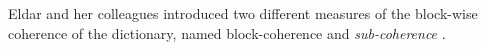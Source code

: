 Eldar and her colleagues introduced two different measures of the block-wise coherence of the dictionary, named block-coherence and \emph{sub-coherence} \cite{Eldar2009b,Eldar2010b,Eldar2010}. 



